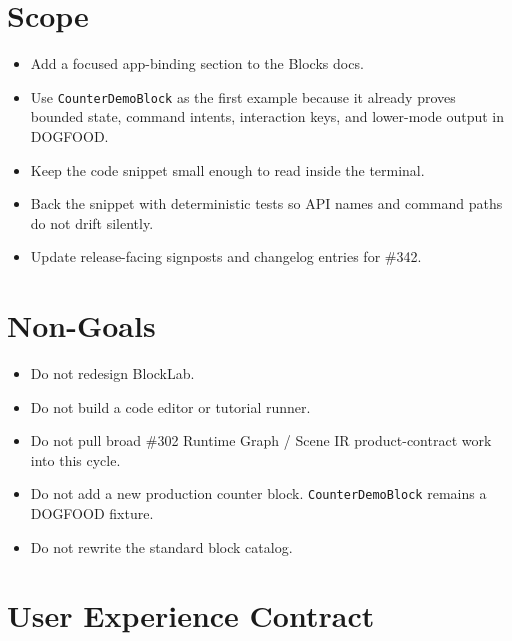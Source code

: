 \section{Scope}\label{record-143-scope}

\begin{itemize}
\tightlist
\item
  Add a focused app-binding section to the Blocks docs.
\item
  Use \texttt{C\allowbreak{}o\allowbreak{}u\allowbreak{}n\allowbreak{}t\allowbreak{}e\allowbreak{}r\allowbreak{}D\allowbreak{}e\allowbreak{}m\allowbreak{}o\allowbreak{}B\allowbreak{}l\allowbreak{}o\allowbreak{}c\allowbreak{}k} as the first example because it already proves bounded state, command intents, interaction keys, and lower-mode output in DOGFOOD.
\item
  Keep the code snippet small enough to read inside the terminal.
\item
  Back the snippet with deterministic tests so API names and command paths do not drift silently.
\item
  Update release-facing signposts and changelog entries for \#342.
\end{itemize}

\section{Non-Goals}\label{record-143-non-goals}

\begin{itemize}
\tightlist
\item
  Do not redesign BlockLab.
\item
  Do not build a code editor or tutorial runner.
\item
  Do not pull broad \#302 Runtime Graph / Scene IR product-contract work into this cycle.
\item
  Do not add a new production counter block. \texttt{C\allowbreak{}o\allowbreak{}u\allowbreak{}n\allowbreak{}t\allowbreak{}e\allowbreak{}r\allowbreak{}D\allowbreak{}e\allowbreak{}m\allowbreak{}o\allowbreak{}B\allowbreak{}l\allowbreak{}o\allowbreak{}c\allowbreak{}k} remains a DOGFOOD fixture.
\item
  Do not rewrite the standard block catalog.
\end{itemize}

\section{User Experience Contract}\label{record-143-user-experience-contract}


